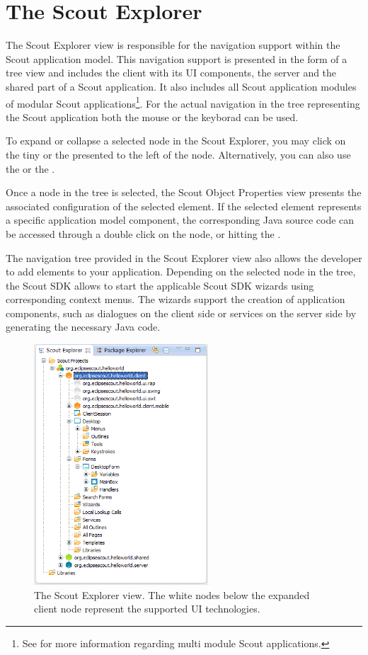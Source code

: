 \documentclass[a4paper,10pt,twoside]{book}
\begin{document}
\section{The Scout Explorer}

The Scout Explorer view is responsible for the navigation support within the Scout application model. 
This navigation support is presented in the form of a tree view and includes the client with its UI components, the server and the shared part of a Scout application. 
It also includes all Scout application modules of modular Scout applications\footnote{
See  for more information regarding multi module Scout applications.
}.
For the actual navigation in the tree representing the Scout application both the mouse or the keyborad can be used. 

To expand or collapse a selected node in the Scout Explorer, you may click on the tiny  or the  presented to the left of the node.
Alternatively, you can also use the  or the .

Once a node in the tree is selected, the Scout Object Properties view presents the associated configuration of the selected element. 
If the selected element represents a specific application model component, the corresponding Java source code can be accessed through a double click on the node, or hitting the . 

The navigation tree provided in the Scout Explorer view also allows the developer to add elements to your application.
Depending on the selected node in the tree, the Scout SDK allows to start the applicable Scout SDK wizards using corresponding context menus. 
The wizards support the creation of application components, such as dialogues on the client side or services on the server side by generating the necessary Java code.

\begin{figure}
\includegraphics[width=6.5cm]{explorer_client.png} 
\caption{The Scout Explorer view. The white nodes below the expanded client node represent the supported UI technologies.}
\end{figure}
\end{document}

